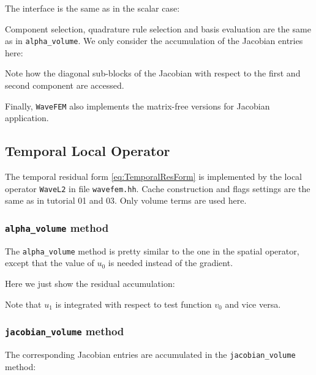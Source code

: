\documentclass[a4paper,12pt]{article}
\begin{document}
The interface is the same as in the scalar case:


Component selection, quadrature rule selection and
basis evaluation are the same as in \lstinline{alpha_volume}.
We only consider the accumulation of the Jacobian entries here:

Note how the diagonal sub-blocks of the Jacobian with respect to
the first and second component are accessed.

Finally, \lstinline{WaveFEM} also implements the matrix-free versions
for Jacobian application.

\subsection{Temporal Local Operator}


The temporal residual form \eqref{eq:TemporalResForm} is
implemented by the local operator \lstinline{WaveL2} in
file \lstinline{wavefem.hh}. Cache construction and flags settings
are the same as in tutorial 01 and 03. Only volume terms are used here.

\subsubsection*{\lstinline{alpha_volume} method}

The \lstinline{alpha_volume} method is pretty similar
to the one in the spatial operator, except that the value of $u_0$
is needed instead of the gradient.

Here we just show the residual accumulation:

Note that $u_1$ is integrated with respect to test function $v_0$
and vice versa.

\subsubsection*{\lstinline{jacobian_volume} method}

The corresponding Jacobian entries are accumulated in the
\lstinline{jacobian_volume} method:

\end{document}
